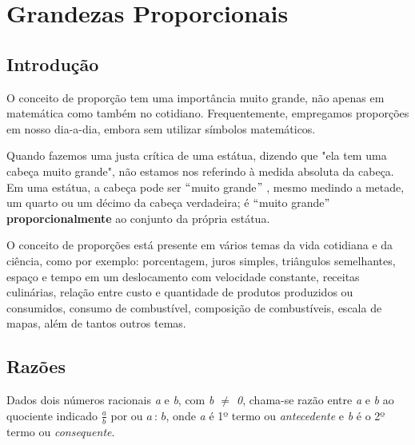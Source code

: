 \chapter{Grandezas Proporcionais}

\section{Introdução}

\quad O conceito de proporção tem uma importância muito grande, não apenas em matemática como também no cotidiano. Frequentemente, empregamos proporções em nosso dia-a-dia, embora sem utilizar símbolos matemáticos. 

\quad Quando fazemos uma justa crítica de uma estátua, dizendo que "ela tem uma cabeça muito grande", não estamos nos referindo à medida absoluta da cabeça. Em uma estátua, a cabeça pode ser $``$muito grande$"$ , mesmo medindo a metade, um quarto ou um décimo da cabeça verdadeira; é $``$muito grande$"$  \textbf{proporcionalmente }ao conjunto da própria estátua.

O conceito de proporções está presente em vários temas da vida cotidiana e da ciência, como por exemplo: porcentagem, juros simples, triângulos semelhantes, espaço e tempo em um deslocamento com velocidade constante, receitas culinárias, relação entre custo e quantidade de produtos produzidos ou consumidos, consumo de combustível, composição de combustíveis, escala de mapas, além de tantos outros temas.


\section{Razões}
 
\begin{caixa}
\begin{tdefinicao}
	Dados dois números racionais \textit{a} e \textit{b}, com \textit{b $\neq$ 0}, chama-se razão entre \textit{a} e \textit{b} ao quociente indicado $\frac{a}{b}$ por ou $a \, : \, b$,
	onde \textit{a} é 1º termo ou \textit{antecedente} e \textit{b }é o 2º termo ou \textit{consequente}.
\end{tdefinicao}
\end{caixa}

